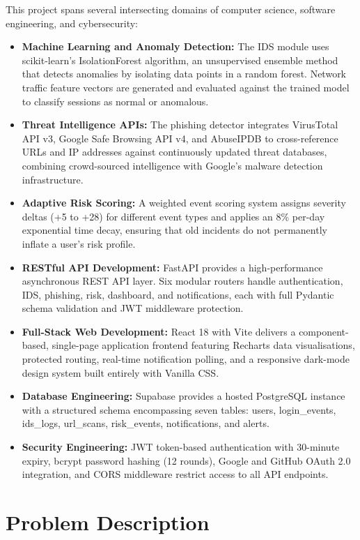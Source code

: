 This project spans several intersecting domains of computer science, software engineering, and cybersecurity:

\begin{itemize}
    \item \textbf{Machine Learning and Anomaly Detection:} The IDS module uses scikit-learn's IsolationForest algorithm, an unsupervised ensemble method that detects anomalies by isolating data points in a random forest. Network traffic feature vectors are generated and evaluated against the trained model to classify sessions as normal or anomalous.
    \item \textbf{Threat Intelligence APIs:} The phishing detector integrates VirusTotal API v3, Google Safe Browsing API v4, and AbuseIPDB to cross-reference URLs and IP addresses against continuously updated threat databases, combining crowd-sourced intelligence with Google's malware detection infrastructure.
    \item \textbf{Adaptive Risk Scoring:} A weighted event scoring system assigns severity deltas (+5 to +28) for different event types and applies an 8\% per-day exponential time decay, ensuring that old incidents do not permanently inflate a user's risk profile.
    \item \textbf{RESTful API Development:} FastAPI provides a high-performance asynchronous REST API layer. Six modular routers handle authentication, IDS, phishing, risk, dashboard, and notifications, each with full Pydantic schema validation and JWT middleware protection.
    \item \textbf{Full-Stack Web Development:} React 18 with Vite delivers a component-based, single-page application frontend featuring Recharts data visualisations, protected routing, real-time notification polling, and a responsive dark-mode design system built entirely with Vanilla CSS.
    \item \textbf{Database Engineering:} Supabase provides a hosted PostgreSQL instance with a structured schema encompassing seven tables: users, login\_events, ids\_logs, url\_scans, risk\_events, notifications, and alerts.
    \item \textbf{Security Engineering:} JWT token-based authentication with 30-minute expiry, bcrypt password hashing (12 rounds), Google and GitHub OAuth 2.0 integration, and CORS middleware restrict access to all API endpoints.
\end{itemize}


\section{Problem Description}

